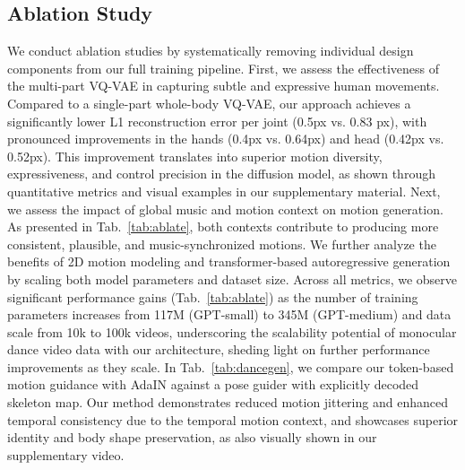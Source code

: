 \subsection{Ablation Study}
We conduct ablation studies by systematically removing individual design components from our full training pipeline. First, we assess the effectiveness of the multi-part VQ-VAE in capturing subtle and expressive human movements. Compared to a single-part whole-body VQ-VAE, our approach achieves a significantly lower L1 reconstruction error per joint (0.5px vs. 0.83 px), with pronounced improvements in the hands (0.4px vs. 0.64px) and head (0.42px vs. 0.52px). This improvement translates into superior motion diversity, expressiveness, and control precision in the diffusion model, as shown through quantitative metrics and visual examples in our supplementary material.
Next, we assess the impact of global music and motion context on motion generation. As presented in Tab.~\ref{tab:ablate}, both contexts contribute to producing more consistent, plausible, and music-synchronized motions. We further analyze the benefits of 2D motion modeling and transformer-based autoregressive generation by scaling both model parameters and dataset size. Across all metrics, we observe significant performance gains (Tab.~\ref{tab:ablate}) as the number of training parameters increases from 117M (GPT-small) to 345M (GPT-medium) and data scale from 10k to 100k videos, underscoring the scalability potential of monocular dance video data with our architecture, sheding light on further performance improvements as they scale. In Tab.~\ref{tab:dancegen}, we compare our token-based motion guidance with AdaIN against a pose guider with explicitly decoded skeleton map. Our method demonstrates reduced motion jittering and enhanced temporal consistency due to the temporal motion context, and showcases superior identity and body shape preservation, as also visually shown in our supplementary video. 